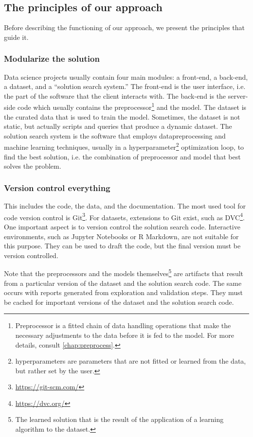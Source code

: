 \subsection{The principles of our approach}

Before describing the functioning of our approach, we present the principles that guide it.

\subsubsection{Modularize the solution}

Data science projects usually contain four main modules: a front-end, a back-end, a
dataset, and a ``solution search system.''  The front-end is the user interface, i.e.
the part of the software that the client interacts with.  The back-end is the server-side
code which usually contains the \gls{preprocessor}\footnote{Preprocessor is a fitted chain of
data handling operations that make the necessary adjustments to the data before it is
fed to the model.  For more details, consult \cref{chap:preprocess}.} and the model.
The dataset is the curated data that is used to train the
model.  Sometimes, the dataset is not static, but actually scripts and queries that
produce a dynamic dataset.  The solution search system is the software that employs \gls{datapreprocessing} and machine learning techniques, usually in a
\gls{hyperparameter}\footnote{\Glspl{hyperparameter} are parameters that are not fitted or learned
from the data, but rather set by the user.} optimization loop,
to find the best solution, i.e. the combination of \gls{preprocessor} and model that best
solves the problem.

\subsubsection{Version control everything}

This includes the code, the data, and the
documentation. The most used tool for code version control is
Git\footnote{\url{https://git-scm.com/}}.  For datasets,
extensions to Git exist, such as DVC\footnote{\url{https://dvc.org/}}.  One important aspect
is to version control the solution search code.  Interactive environments, such as Jupyter
Notebooks or R Markdown, are not suitable for this purpose.  They can be used to draft the code, but
the final version must be version controlled.

Note that the \glspl{preprocessor} and the models themselves\footnote{The learned
solution that is the result of the application of a learning algorithm to the dataset.} are
artifacts that result from a particular version of the dataset and the solution search
code.  The same occurs with reports generated from exploration and validation
steps.  They must be cached for important versions of the dataset and the solution search
code.

